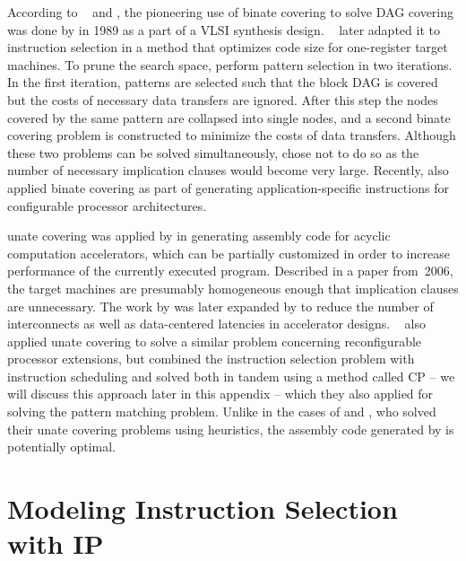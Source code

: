 According to \citeauthor{Liao1995}~\cite{Liao1995, Liao1998} and
\textcite{Cong2004}, the pioneering use of \gls{binate covering} to solve
\gls{DAG covering} was done by \textcite{Rudell1989} in 1989 as a part of a
\gls{VLSI} synthesis design.
%
\citeauthor{Liao1995}~\cite{Liao1995, Liao1998} later adapted it to
\gls{instruction selection} in a method that optimizes code size for
one-\gls{register} \glspl{target machine}.
%
To prune the search space,
\citeauthor{Liao1995} perform \gls{pattern selection} in two iterations.
%
In the
first iteration, \glspl{pattern} are selected such that the \gls{block DAG} is
covered but the costs of necessary data transfers are ignored.
%
After this step
the \glspl{node} covered by the same \gls{pattern} are collapsed into single
\glspl{node}, and a second \gls{binate covering} problem is constructed to
minimize the costs of data transfers.
%
Although these two problems can be solved
simultaneously, \citeauthor{Liao1995} chose not to do so as the number of
necessary \glspl{implication clause} would become very large.
%
Recently,
\textcite{Cong2004} also applied \gls{binate covering} as part of generating
application-specific \glspl{instruction} for configurable processor
architectures.

\Gls{unate covering} was applied by \textcite{Clark2006} in generating
\gls{assembly code} for acyclic computation accelerators, which can be partially
customized in order to increase performance of the currently executed
\gls{program}.
%
Described in a paper from~2006, the \glspl{target machine} are
presumably homogeneous enough that \glspl{implication clause} are
unnecessary.
%
The work by \citeauthor{Clark2006} was later expanded by
\textcite{Hormati2007} to reduce the number of interconnects as well as
data-centered latencies in accelerator
designs.
%
\citeauthor{Martin2009}~\cite{Martin2009, Martin2012} also applied
\gls{unate covering} to solve a similar problem concerning reconfigurable
processor extensions, but combined the \gls{instruction selection} problem with
\gls{instruction scheduling} and solved both in tandem using a method called
\glsdesc{CP} -- we will discuss this approach later in this appendix -- which
they also applied for solving the \gls{pattern matching} problem.
%
Unlike in the
cases of \citeauthor{Clark2006} and \citeauthor{Hormati2007}, who solved their
\gls{unate covering} problems using heuristics, the \gls{assembly code}
generated by \citeauthor{Martin2009} is potentially optimal.


\section{Modeling Instruction Selection with IP}


